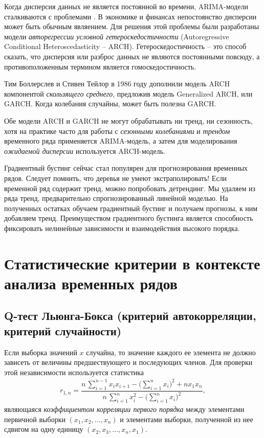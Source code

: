 \documentclass[%
	11pt,
	a4paper,
	utf8,
		]{article}
\begin{document}
Когда дисперсия данных не является постоянной во времени, ARIMA-модели сталкиваются с проблемами \cite[]{gruzdev:time-series-2022}. В экономике и финансах непостоянство дисперсии может быть обычным являением. Для решения этой проблемы были разработаны модели \emph{авторегрессии условной гетероскедостичности} (Autoregressive Conditional Heteroscedasticity -- ARCH). Гетероскедостичность -- это способ сказать, что дисперсия или разброс данных не являются постоянными повсюду, а противоположенным термином является гомоскедостичность.

Тим Боллерслев и Стивен Тейлор в 1986 году дополнили модель ARCH компонентой \emph{скользящего среднего}, предложив модель Generalized ARCH, или GARCH. Когда колебания случайны, может быть полезна GARCH.

{\color{red}Обе модели ARCH и GARCH не могут обрабатывать ни тренд, ни сезонность}, хотя на практике часто для работы с \emph{сезонными колебаниями} и \emph{трендом} временного ряда применяется ARIMA-модель, а затем для моделирования \emph{ожидаемой дисперсии} используется ARCH-модель.

Градиентный бустинг сейчас стал популярен для прогнозирования временных рядов. Следует помнить, что {\color{red}деревья не умеют экстраполировать!} Если временной ряд содержит тренд, можно попробовать детрендинг. Мы удаляем из ряда тренд, предварительно спрогнозированный линейной моделью. На полученных остатках обучаем градиентный бустинг и получаем прогнозы, к ним добавляем тренд. Преимуществом градиентного бустинга является способность фиксировать нелинейные зависимости и взаимодействия высокого порядка.

\section{Статистические критерии в контексте анализа временных рядов}

\subsection{Q-тест Льюнга-Бокса (критерий автокорреляции, критерий случайности)}

Если выборка значений $ x $ случайна, то значение каждого ее элемента не должно зависеть от величины предшествующего и последующих членов. Для проверки этой независимости используется статистика \cite[]{kobzar-2012}
\begin{align*}
	r_{1, n} = \dfrac{ n \, \sum\limits_{i=1}^{n-1} x_i x_{i + 1} - \bigg( \sum\limits_{i=1}^n x_i \bigg)^2 + nx_1x_n}{ n \, \sum\limits_{i=1}^{n} x_i^2 - \bigg( \sum\limits_{i=1}^{n} x_i \bigg)^2},
\end{align*}
являющаяся \emph{коэффициентом корреляции первого порядка} между элементами первичной выборки $ (x_1, x_2, \ldots, x_n) $ и элементами выборки, полученной из нее сдвигом на одну единицу $ (x_2, x_3, \ldots, x_n, x_1) $.
\end{document}
